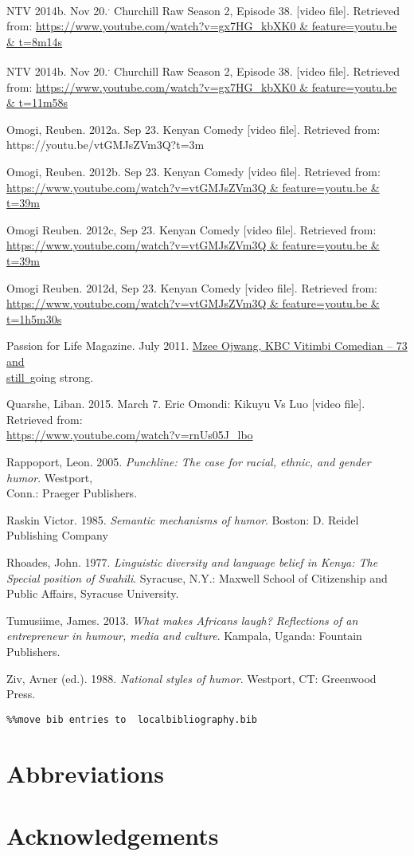 \documentclass[output=paper]{langsci/langscibook}
\begin{document}
NTV 2014b. Nov 20.\textsuperscript{. }Churchill Raw Season 2, Episode 38. [video file]. Retrieved from: \url{https://www.youtube.com/watch?v=gx7HG_kbXK0 & feature=youtu.be & t=8m14s}

NTV 2014b. Nov 20.\textsuperscript{. }Churchill Raw Season 2, Episode 38. [video file]. Retrieved from: \url{https://www.youtube.com/watch?v=gx7HG_kbXK0 & feature=youtu.be & t=11m58s}

Omogi, Reuben. 2012a. Sep 23. Kenyan Comedy [video file]. Retrieved from: https://youtu.be/vtGMJsZVm3Q?t=3m

Omogi, Reuben. 2012b. Sep 23. Kenyan Comedy [video file]. Retrieved from: \url{https://www.youtube.com/watch?v=vtGMJsZVm3Q & feature=youtu.be & t=39m}

Omogi Reuben. 2012c, Sep 23. Kenyan Comedy [video file]. Retrieved from: \url{https://www.youtube.com/watch?v=vtGMJsZVm3Q & feature=youtu.be & t=39m}

Omogi Reuben. 2012d, Sep 23. Kenyan Comedy [video file]. Retrieved from: \url{https://www.youtube.com/watch?v=vtGMJsZVm3Q & feature=youtu.be & t=1h5m30s}

Passion for Life Magazine. July 2011. \href{http://www.kenyanmagazines.com/mzee-ojwang-kbc-vitimbi-comedian/}{Mzee Ojwang, KBC Vitimbi Comedian – 73 and \\
   still~}going strong. 

Quarshe, Liban. 2015. March 7. Eric Omondi: Kikuyu Vs Luo [video file]. Retrieved from: \\
   \url{https://www.youtube.com/watch?v=rnUs05J_lbo}

Rappoport, Leon. 2005. \textit{Punchline: The case for racial, ethnic, and gender humor}. Westport, \\
   Conn.: Praeger Publishers.

Raskin Victor. 1985. \textit{Semantic mechanisms of humor}. Boston: D. Reidel Publishing Company

Rhoades, John. 1977. \textit{Linguistic diversity and language belief in Kenya: The Special position of Swahili}. Syracuse, N.Y.: Maxwell School of Citizenship and Public Affairs, Syracuse University.

Tumusiime, James. 2013. \textit{What makes Africans laugh? Reflections of an entrepreneur in humour, media and culture}. Kampala, Uganda: Fountain Publishers.

Ziv, Avner (ed.). 1988. \textit{National styles of humor}. Westport, CT: Greenwood Press.


\begin{verbatim}%%move bib entries to  localbibliography.bib
\end{verbatim}

\section*{Abbreviations}
\section*{Acknowledgements}

\printbibliography[heading=subbibliography,notkeyword=this]
\end{document}
